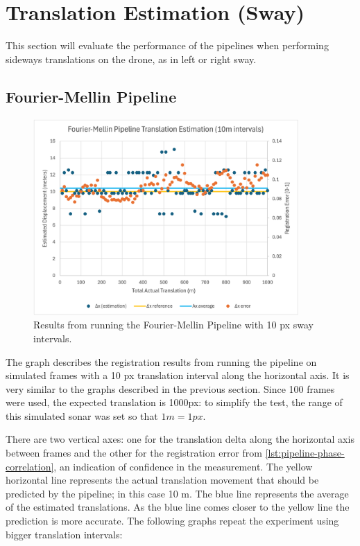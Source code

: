 \section{Translation Estimation (Sway)}

This section will evaluate the performance of the pipelines when performing sideways translations on the drone, as in left or right sway.

\subsection{Fourier-Mellin Pipeline}

\begin{figure}[H]
  \centering
  \includegraphics[width=0.9\textwidth]{figures/results/Translation-Graph/FMT-0.png}
  \caption{Results from running the Fourier-Mellin Pipeline with 10 px sway intervals.}
\end{figure}

The graph describes the registration results from running the pipeline on simulated frames with a 10 px translation interval along the horizontal axis. It is very similar to the graphs described in the previous section. Since 100 frames were used, the expected translation is 1000px: to simplify the test, the range of this simulated sonar was set so that \(1m = 1px\). 

There are two vertical axes: one for the translation delta along the horizontal axis between frames and the other for the registration error from \autoref{lst:pipeline-phase-correlation}, an indication of confidence in the measurement. The yellow horizontal line represents the actual translation movement that should be predicted by the pipeline; in this case 10 m. The blue line represents the average of the estimated translations. As the blue line comes closer to the yellow line the prediction is more accurate. The following graphs repeat the experiment using bigger translation intervals:


